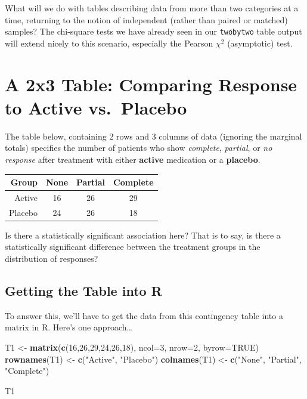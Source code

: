 \documentclass[
]{book}
\newenvironment{Shaded}{\begin{snugshade}}{\end{snugshade}}
\newcommand{\DataTypeTok}[1]{\textcolor[rgb]{0.13,0.29,0.53}{#1}}
\newcommand{\DecValTok}[1]{\textcolor[rgb]{0.00,0.00,0.81}{#1}}
\newcommand{\KeywordTok}[1]{\textcolor[rgb]{0.13,0.29,0.53}{\textbf{#1}}}
\newcommand{\NormalTok}[1]{#1}
\newcommand{\OtherTok}[1]{\textcolor[rgb]{0.56,0.35,0.01}{#1}}
\newcommand{\StringTok}[1]{\textcolor[rgb]{0.31,0.60,0.02}{#1}}
\begin{document}
What will we do with tables describing data from more than two categories at a time, returning to the notion of independent (rather than paired or matched) samples? The chi-square tests we have already seen in our \texttt{twobytwo} table output will extend nicely to this scenario, especially the Pearson \(\chi^2\) (asymptotic) test.

\hypertarget{a-2x3-table-comparing-response-to-active-vs.-placebo}{%
\section{A 2x3 Table: Comparing Response to Active vs.~Placebo}\label{a-2x3-table-comparing-response-to-active-vs.-placebo}}

The table below, containing 2 rows and 3 columns of data (ignoring the marginal totals) specifies the number of patients who show \emph{complete}, \emph{partial}, or \emph{no response} after treatment with either \textbf{active} medication or a \textbf{placebo}.

\begin{longtable}[]{@{}rccc@{}}
\toprule
Group & None & Partial & Complete\tabularnewline
\midrule
\endhead
Active & 16 & 26 & 29\tabularnewline
Placebo & 24 & 26 & 18\tabularnewline
\bottomrule
\end{longtable}

Is there a statistically significant association here? That is to say, is there a statistically significant difference between the treatment groups in the distribution of responses?

\hypertarget{getting-the-table-into-r}{%
\subsection{Getting the Table into R}\label{getting-the-table-into-r}}

To answer this, we'll have to get the data from this contingency table into a matrix in R. Here's one approach\ldots{}

\begin{Shaded}
\begin{Highlighting}[]
\NormalTok{T1 <-}\StringTok{ }\KeywordTok{matrix}\NormalTok{(}\KeywordTok{c}\NormalTok{(}\DecValTok{16}\NormalTok{,}\DecValTok{26}\NormalTok{,}\DecValTok{29}\NormalTok{,}\DecValTok{24}\NormalTok{,}\DecValTok{26}\NormalTok{,}\DecValTok{18}\NormalTok{), }\DataTypeTok{ncol=}\DecValTok{3}\NormalTok{, }\DataTypeTok{nrow=}\DecValTok{2}\NormalTok{, }\DataTypeTok{byrow=}\OtherTok{TRUE}\NormalTok{)}
\KeywordTok{rownames}\NormalTok{(T1) <-}\StringTok{ }\KeywordTok{c}\NormalTok{(}\StringTok{"Active"}\NormalTok{, }\StringTok{"Placebo"}\NormalTok{)}
\KeywordTok{colnames}\NormalTok{(T1) <-}\StringTok{ }\KeywordTok{c}\NormalTok{(}\StringTok{"None"}\NormalTok{, }\StringTok{"Partial"}\NormalTok{, }\StringTok{"Complete"}\NormalTok{)}

\NormalTok{T1}
\end{Highlighting}
\end{Shaded}
\end{document}
